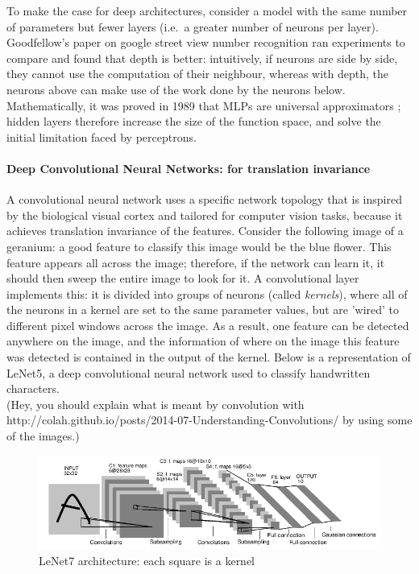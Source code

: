 \documentclass[a4paper,11pt]{article}
\begin{document}
To make the case for deep architectures, consider a model with the same number of parameters but fewer layers (i.e.\ a greater number of neurons per layer). Goodfellow's paper on google street view number recognition ran experiments to compare and found that depth is better: intuitively, if neurons are side by side, they cannot use the computation of their neighbour, whereas with depth, the neurons above can make use of the work done by the neurons below. \\	

Mathematically, it was proved in 1989 that MLPs are universal approximators \cite{MLP-univ-approx}; hidden layers therefore increase the size of the function space, and solve the initial limitation faced by perceptrons.\\


\paragraph{Deep Convolutional Neural Networks: for translation invariance}

A convolutional neural network uses a specific network topology that is inspired by the biological visual cortex and tailored for computer vision tasks, because it achieves translation invariance of the features. Consider the following image of a geranium: a good feature to classify this image would be the blue flower. This feature appears all across the image; therefore, if the network can learn it, it should then sweep the entire image to look for it. A convolutional layer implements this: it is divided into groups of neurons (called \textit{kernels}), where all of the neurons in a kernel are set to the same parameter values, but are 'wired' to different pixel windows across the image. As a result, one feature can be detected anywhere on the image, and the information of where on the image this feature was detected is contained in the output of the kernel. Below is a representation of LeNet5, a deep convolutional neural network used to classify handwritten characters. \\

(Hey, you should explain what is meant by convolution with http://colah.github.io/posts/2014-07-Understanding-Convolutions/ by using some of the images.) \\

\begin{figure}[h!]
	\centering
	\includegraphics[scale=0.6]{images/lenet5.png}
	\caption{LeNet7 architecture: each square is a kernel}
\end{figure}
\end{document}
